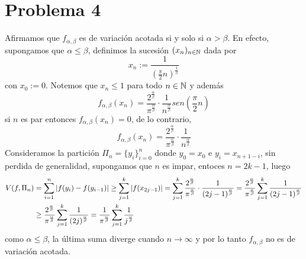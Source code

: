 \documentclass{article}
\begin{document}
\section*{Problema 4}
\noindent Afirmamos que $f_{\alpha,\beta}$ es de variación acotada si y solo si $\alpha>\beta$. 
En efecto, supongamos que $\alpha\leq\beta$, definimos la sucesión $(x_{n})_{n\in\mathbb{N}}$ dada por
\begin{equation*}
    x_{n}:=\frac{1}{(\frac{\pi}{2} n)^{\frac{1}{\beta}}}
\end{equation*}
con $x_{0}:=0$. Notemos que $x_{n}\leq1$ para todo $n\in\mathbb{N}$ y además
\begin{equation*}
    f_{\alpha,\beta}(x_{n})=\frac{2^{\frac{\alpha}{\beta}}}{\pi^{\frac{\alpha}{\beta}}}\cdot
    \frac{1}{n^{\frac{\alpha}{\beta}}}sen\left(\frac{\pi}{2} n\right)
\end{equation*}
si $n$ es par entonces $f_{\alpha,\beta}(x_{n})=0$, de lo contrario,
\begin{equation*}
    f_{\alpha,\beta}(x_{n})=\frac{2^{\frac{\alpha}{\beta}}}{\pi^{\frac{\alpha}{\beta}}}\cdot
    \frac{1}{n^{\frac{\alpha}{\beta}}}
\end{equation*}
Consideramos la partición $\Pi_{n}=\{y_{i}\}_{i=0}^{n}$ donde $y_{0}=x_{0}$ e $y_{i}=x_{n+1-i}$, 
sin perdida de generalidad, supongamos que $n$ es impar, entoces $n=2k-1$, luego
\begin{align*}
    V(f,\Pi_{n}) &= \sum_{i=1}^{n}\left|f(y_{i})-f(y_{i-1}) \right|\geq\sum_{j=1}^{k}\left|f(x_{2j-1}) \right|
    =\sum_{j=1}^{k}\frac{2^{\frac{\alpha}{\beta}}}{\pi^{\frac{\alpha}{\beta}}}\cdot
    \frac{1}{(2j-1)^{\frac{\alpha}{\beta}}}=\frac{2^{\frac{\alpha}{\beta}}}
    {\pi^{\frac{\alpha}{\beta}}}\sum_{j=1}^{k}\frac{1}{(2j-1)^{\frac{\alpha}{\beta}}} \\
    &\geq\frac{2^{\frac{\alpha}{\beta}}}
    {\pi^{\frac{\alpha}{\beta}}}\sum_{j=1}^{k}\frac{1}{(2j)^{\frac{\alpha}{\beta}}}
    =\frac{1}{\pi^{\frac{\alpha}{\beta}}}\sum_{j=1}^{k}\frac{1}{j^{\frac{\alpha}{\beta}}}
\end{align*}
como $\alpha\leq\beta$, la última suma diverge cuando $n\to\infty$ y por lo tanto 
$f_{\alpha,\beta}$ no es de variación acotada.
\end{document}
